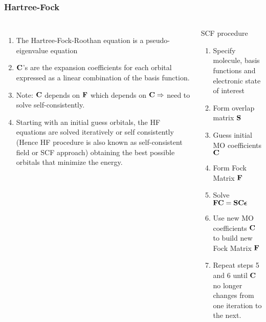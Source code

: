 \documentclass[slidestop,mathserif,compress,xcolor=svgnames]{beamer}
\begin{document}
\begin{frame}
\frametitle{\small Hartree-Fock}
\footnotesize{
\begin{columns}
\column{12cm}
\begin{enumerate}
\item The Hartree-Fock-Roothan equation is a pseudo-eigenvalue equation
\item ${\bf C}$'s are the expansion coefficients for each orbital expressed as a linear combination of the basis function.
\item Note: ${\bf C}$ depends on ${\bf F}$ which depends on ${\bf C}\Rightarrow$ need to solve self-consistently.
\item Starting with an initial guess orbitals, the HF equations are solved iteratively or self consistently (Hence HF procedure is also known as self-consistent field or SCF approach) obtaining the best possible orbitals that minimize the energy.
\end{enumerate}
\vspace{-0.3cm}
\begin{block}{\footnotesize SCF procedure}
\begin{enumerate}
\item Specify molecule, basis functions and electronic state of interest
\item Form overlap matrix ${\bf S}$
\item Guess initial MO coefficients ${\bf C}$
\item Form Fock Matrix ${\bf F}$
\item Solve ${\bf FC}={\bf SC}{\boldsymbol\epsilon}$
\item Use new MO coefficients ${\bf C}$ to build new Fock Matrix ${\bf F}$
\item Repeat steps 5 and 6 until ${\bf C}$ no longer changes from one iteration to the next.
\end{enumerate}
\end{block}
\end{columns}
}
\end{frame}
\end{document}
